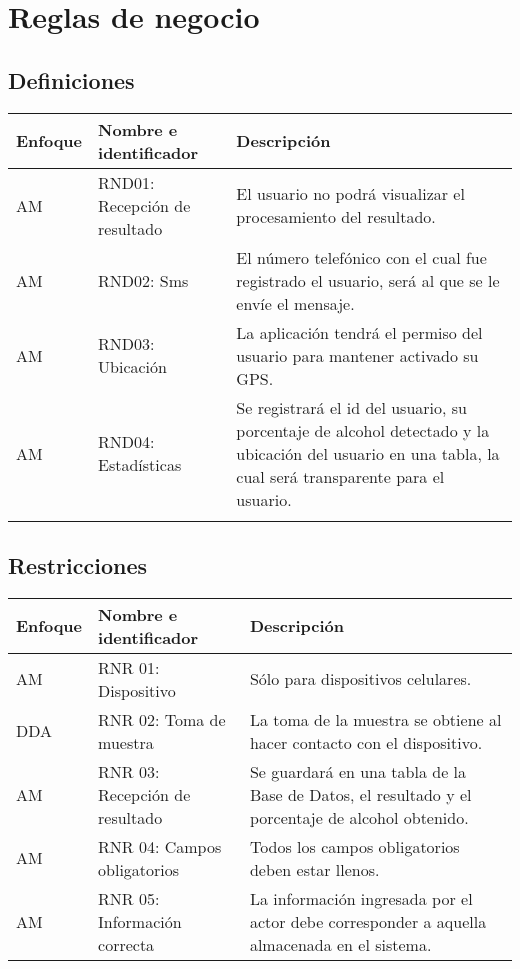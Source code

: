 \section{Reglas de negocio}
\subsection{Definiciones}
  \begin{center}
   \begin{tabular}{|p{2cm}|p{3.5cm}|p{7cm}|}
     \hline
       \textbf{Enfoque}&\textbf{Nombre e identificador} & \textbf{Descripción} \\ \hline
           AM & RND01: Recepción de resultado &  El usuario no podrá visualizar el procesamiento del resultado. \\ \hline
           AM & RND02: Sms &  El número telefónico con el cual fue registrado el usuario, será al que se le envíe el mensaje. \\ \hline
           AM & RND03: Ubicación &  La aplicación tendrá el permiso del usuario para mantener activado su GPS. \\ \hline
           AM & RND04: Estadísticas &  Se registrará el id del usuario, su porcentaje de alcohol detectado y la ubicación del usuario en una tabla, la cual será transparente para el usuario. \\ \\ \hline
   \end{tabular}
    \label{tab:rnd}
 \end{center}

\subsection{Restricciones}
  \begin{center}
   \begin{tabular}{|p{2cm}|p{3.5cm}|p{7cm}|}
     \hline
       \textbf{Enfoque}&\textbf{Nombre e identificador} & \textbf{Descripción} \\ \hline
           AM & RNR 01: Dispositivo &  Sólo para dispositivos celulares. \\ \hline
           DDA & RNR 02: Toma de muestra &  La toma de la muestra se obtiene al hacer contacto con el dispositivo. \\ \hline
           AM & RNR 03: Recepción de resultado &  Se guardará en una tabla de la Base de Datos, el resultado y el porcentaje de alcohol
 obtenido. \\ \hline
         \label{rnl_01} AM & RNR 04: Campos obligatorios & Todos los campos obligatorios deben estar llenos. \\ \hline
         \label{rnl_02} AM & RNR 05: Información correcta & La información ingresada por el actor debe corresponder a aquella almacenada en el sistema. \\ \hline
     	     
   \end{tabular}
    \label{tab:rnr}
 \end{center}  
